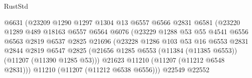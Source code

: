\begin{lexlean}{RustStd}
\begin{coremodule}
                                      @6631
                                      (@23209
                                        @1290
                                        @1297
                                        @1304
                                        @13
                                        @6557
                                        @6566
                                        @2831
                                        @6581
                                        (@23220
                                          @1289
                                          @489
                                          @18163
                                          @6557
                                          @6564
                                          @6076
                                          (@23229
                                            @1288
                                            @53
                                            @55
                                            @4541
                                            @6556
                                            @6563
                                            @2819
                                            @6537
                                            @2825
                                            @21696
                                            (@23228
                                              @1286
                                              @103
                                              @53
                                              @16
                                              @6553
                                              @2831
                                              @2844
                                              @2819
                                              @6547
                                              @2825
                                              (@21656
                                                @1285
                                                @6553
                                                (@11384 (@11385 @6553))
                                                (@11207 (@11390 @1285 @53)))
                                              @21623
                                              @11210
                                              (@11207 (@11212 @6548 @2831)))
                                            @11210
                                            (@11207 (@11212 @6538 @6556)))
                                          @22549
                                          @22552

\end{coremodule}
\end{lexlean}
